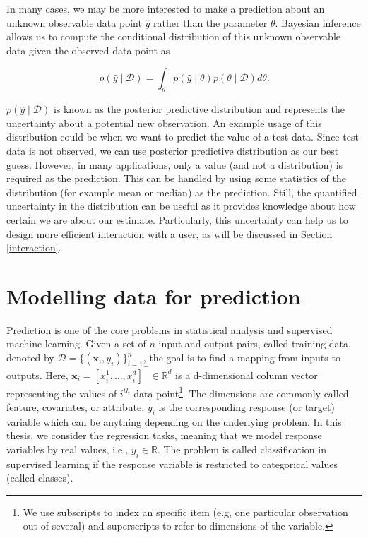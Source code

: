 \documentclass[dissertation,math,vertlayout,pdfa,colorlinks]{aaltoseries}
\newcommand{\bD}{\mathcal{D}}
\newcommand{\tp}{^{\top}}
\begin{document}
In many cases, we may be more interested to make a prediction about an unknown observable data point $\hat{y}$ rather than the parameter $\theta$. Bayesian inference  allows us to compute the conditional distribution of this unknown observable data given the observed data point as 

\begin{equation}
p(\hat{y} \mid\bD ) = \int_{\theta} p(\hat{y}  \mid \theta)p(\theta \mid \bD)d\theta. 
\end{equation}

$p(\hat{y} \mid \bD)$ is known as the posterior predictive distribution and represents the uncertainty about a potential new observation. An example usage of this distribution could be when we want to predict the value of a test data. Since test data is not observed, we can use posterior predictive distribution as our best guess. However, in many applications, only a value (and not a distribution) is required as the prediction. This can be handled by using some statistics of the distribution (for example mean or median) as the prediction. Still, the quantified uncertainty in the distribution can be useful as it provides knowledge about how certain we are about our estimate. Particularly, this uncertainty can help us to design more efficient interaction with a user, as will be discussed in Section \ref{interaction}.

	


\section{Modelling data for prediction} \label{prob_model_data}

Prediction is one of the core problems in statistical analysis and supervised machine learning. Given a set of $n$ input and output pairs, called training data, denoted by $\bD= \{(\bm{x}_i,y_i)\}_{i=1}^{n}$, the goal is to find a mapping from inputs to outputs. Here, $\bm{x}_i = [x_i^1,\ldots,x_i^d]\tp \in \mathbb{R}^d$ is a d-dimensional column vector representing the values of $i^{th}$ data point\footnote{We use subscripts to index an specific item (e.g, one particular observation out of several) and superscripts to refer to dimensions of the variable.}. The dimensions are commonly called feature, covariates, or attribute. $y_i$ is the corresponding response (or target) variable which can be anything depending on the underlying problem. In this thesis, we consider the regression tasks, meaning that we model response variables by real values, i.e., $y_i \in \mathbb{R}$. The problem is called classification in supervised learning if the response variable is restricted to categorical values (called classes). 
\end{document}
